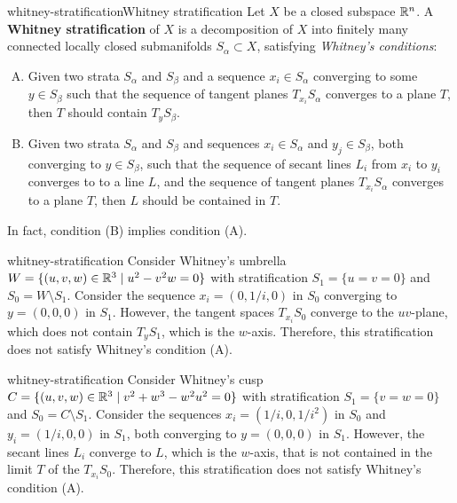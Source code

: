 \begin{topic}{whitney-stratification}{Whitney stratification}
    Let $X$ be a closed subspace $\mathbb{R}^n$. A \textbf{Whitney stratification} of $X$ is a decomposition of $X$ into finitely many connected locally closed submanifolds $S_\alpha \subset X$, satisfying \textit{Whitney's conditions}:
    \begin{enumerate}[(A)]
        \item Given two strata $S_\alpha$ and $S_\beta$ and a sequence $x_i \in S_\alpha$ converging to some $y \in S_\beta$ such that the sequence of tangent planes $T_{x_i} S_\alpha$ converges to a plane $T$, then $T$ should contain $T_y S_\beta$.
        \item Given two strata $S_\alpha$ and $S_\beta$ and sequences $x_i \in S_\alpha$ and $y_j \in S_\beta$, both converging to $y \in S_\beta$, such that the sequence of secant lines $L_i$ from $x_i$ to $y_i$ converges to to a line $L$, and the sequence of tangent planes $T_{x_i} S_\alpha$ converges to a plane $T$, then $L$ should be contained in $T$.
    \end{enumerate}
    In fact, condition (B) implies condition (A).
\end{topic}

\begin{example}{whitney-stratification}
    Consider Whitney's umbrella $W = \{ (u, v, w) \in \mathbb{R}^3 \mid u^2 - v^2 w = 0 \}$ with stratification $S_1 = \{ u = v = 0 \}$ and $S_0 = W \setminus S_1$. Consider the sequence $x_i = (0, 1/i, 0)$ in $S_0$ converging to $y = (0, 0, 0)$ in $S_1$. However, the tangent spaces $T_{x_i} S_0$ converge to the $uv$-plane, which does not contain $T_y S_1$, which is the $w$-axis. Therefore, this stratification does not satisfy Whitney's condition (A).
\end{example}

\begin{example}{whitney-stratification}
    Consider Whitney's cusp $C = \{ (u, v, w) \in \mathbb{R}^3 \mid v^2 + w^3 - w^2 u^2 = 0 \}$ with stratification $S_1 = \{ v = w = 0 \}$ and $S_0 = C \setminus S_1$.
    Consider the sequences $x_i = (1/i, 0, 1/i^2)$ in $S_0$ and $y_i = (1/i, 0, 0)$ in $S_1$, both converging to $y = (0, 0, 0)$ in $S_1$. However, the secant lines $L_i$ converge to $L$, which is the $w$-axis, that is not contained in the limit $T$ of the $T_{x_i} S_0$. Therefore, this stratification does not satisfy Whitney's condition (A).
\end{example}
